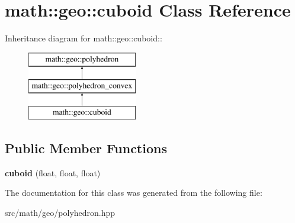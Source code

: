 \hypertarget{classmath_1_1geo_1_1cuboid}{
\section{math::geo::cuboid Class Reference}
\label{classmath_1_1geo_1_1cuboid}
}
Inheritance diagram for math::geo::cuboid::\begin{figure}[H]
\begin{center}
\leavevmode
\includegraphics[height=3cm]{classmath_1_1geo_1_1cuboid}
\end{center}
\end{figure}
\subsection*{Public Member Functions}
\begin{DoxyCompactItemize}
\item 
\hypertarget{classmath_1_1geo_1_1cuboid_a72bd7e6bf32ccd6928e375efa3036491}{
{\bfseries cuboid} (float, float, float)}
\label{classmath_1_1geo_1_1cuboid_a72bd7e6bf32ccd6928e375efa3036491}

\end{DoxyCompactItemize}


The documentation for this class was generated from the following file:\begin{DoxyCompactItemize}
\item 
src/math/geo/polyhedron.hpp\end{DoxyCompactItemize}

